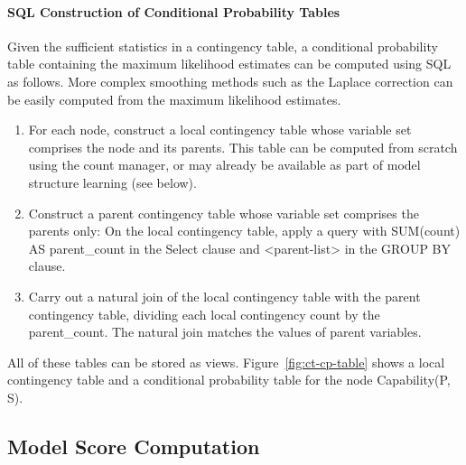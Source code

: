 \documentclass{acm_proc_article-sp}
\begin{document}
\paragraph{SQL Construction of Conditional Probability Tables} Given the sufficient statistics in a contingency table, a conditional probability table containing the maximum likelihood estimates can be computed using SQL as follows. More complex smoothing methods such as the Laplace correction can be easily computed from the maximum likelihood estimates.

\begin{enumerate}
\item For each node, construct a local contingency table whose variable set comprises the node and its parents. This table can be computed from scratch using the count manager, or may already be available as part of model structure learning (see below). 
\item Construct a  parent contingency table whose variable set comprises the parents only:  On the local contingency table, apply a query with SUM(count) AS parent\_count in the Select clause and <parent-list> in the GROUP BY clause. 
\item Carry out a natural join of the local contingency table with the parent contingency table, dividing each local contingency count by the parent\_count. The natural join matches the values of parent variables. 
\end{enumerate}

All of these tables can be stored as views. 
Figure~\ref{fig:ct-cp-table} shows a local contingency table and a conditional probability table for the node Capability(P, S). 



\subsection{Model Score Computation} \label{sec:model-score}
\end{document}
